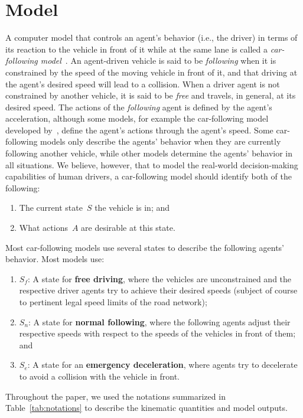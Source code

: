 \documentclass[preprint]{./acm_proc_article-sp}
\begin{document}
\section{Model}

A computer model that controls an agent's behavior (i.e., the driver) in terms of its reaction to the vehicle in front of it while at the same lane is called a {\em car-following model}~\citep{herman63}. An agent-driven vehicle is said to be {\em following} when it is constrained by the speed of the moving vehicle in front of it, and that driving at the agent's desired speed will lead to a collision. When a driver agent is not constrained by another vehicle, it is said to be {\em free} and travels, in general, at its desired speed. The actions of the {\em following} agent is defined by the agent's acceleration, although some models, for example the car-following model developed by~\citet{gipps81}, define the agent's actions through the agent's speed. Some car-following models only describe the agents' behavior when they are currently following another vehicle, while other models determine the agents' behavior in all situations. We believe, however, that to model the real-world decision-making capabilities of human drivers, a car-following model should identify both of the following:
\begin{enumerate}
\item The current state~$S$ the vehicle is in; and
\item What actions~$A$ are desirable at this state.
\end{enumerate}
Most car-following models use several states to describe the following agents' behavior. Most models use:
\begin{enumerate}
\item $S_f$: A state for {\bf free driving}, where the vehicles are unconstrained and the respective driver agents try to achieve their desired speeds (subject of course to pertinent legal speed limits of the road network);
\item $S_n$: A state for {\bf normal following}, where the following agents adjust their respective speeds with respect to the speeds of the vehicles in front of them; and
\item $S_e$: A state for an {\bf emergency deceleration}, where agents try to decelerate to avoid a collision with the vehicle in front.
\end{enumerate} 

Throughout the paper, we used the notations summarized in Table~\ref{tab:notations} to describe the kinematic quantities and model outputs.
\end{document}
